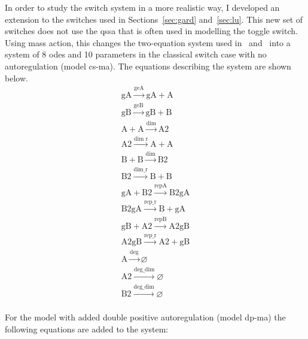In order to study the switch system in a more realistic way, I developed an extension to the switches used in Sections~\ref{sec:gard} and~\ref{sec:lu}. This new set of switches does not use the \acrfull{qssa} that is often used in modelling the toggle switch. Using mass action, this changes the two-equation system used in~\textcite{Gardner:2000vha} and~\textcite{Lu:2014kc} into a system of 8 \acrshort{ode}s and 10 parameters in the classical switch case with no autoregulation (model \acrshort{cs-ma}). The equations describing the system are shown below. 
$$
\begin{array}{cccc}
      \textrm{gA}\stackrel{\textrm{geA}}{\longrightarrow}\textrm{gA} + \textrm{A} \\
      \textrm{gB}\stackrel{\textrm{geB}}{\longrightarrow}\textrm{gB} + \textrm{B} \\
      \textrm{A} + \textrm{A} \stackrel{\textrm{dim}}{\longrightarrow}\textrm{A2} \\
      \textrm{A2} \stackrel{\textrm{dim r}}{\longrightarrow}\textrm{A} + \textrm{A} \\
      \textrm{B} + \textrm{B} \stackrel{\textrm{dim}}{\longrightarrow} \textrm{B2} \\
      \textrm{B2} \stackrel{\textrm{dim\_r}}{\longrightarrow}\textrm{B} + \textrm{B} \\
      \textrm{gA} + \textrm{B2} \stackrel{\textrm{repA}}{\longrightarrow}\textrm{B2gA} \\
      \textrm{B2gA} \stackrel{\textrm{rep\_r}}{\longrightarrow}\textrm{B} + \textrm{gA} \\
      \textrm{gB} + \textrm{A2} \stackrel{\textrm{repB}}{\longrightarrow}\textrm{A2gB} \\
      \textrm{A2gB} \stackrel{\textrm{rep\_r}}{\longrightarrow}\textrm{A2} + \textrm{gB} \\
      \textrm{A} \stackrel{\textrm{deg}}{\longrightarrow}\varnothing\\
      \textrm{A2} \stackrel{\textrm{deg\_dim}}{\longrightarrow} \varnothing\\
      \textrm{B2} \stackrel{\textrm{deg\_dim}}{\longrightarrow}\varnothing\\
\end{array}
$$

For the model with added double positive autoregulation (model \acrshort{dp-ma}) the following equations are added to the system: 

